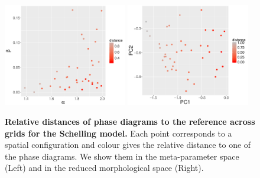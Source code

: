 \documentclass[preprint,5p,times,twocolumn,authoryear]{elsarticle}
\begin{document}
\begin{figure}[h!]
\centering
\includegraphics[width=0.48\textwidth]{figures/schelling-relativedistance_metaparams_red}
\includegraphics[width=0.48\textwidth]{figures/schelling-relativedistance_morphspace_red}
\caption{\textbf{Relative distances of phase diagrams to the reference across grids for the Schelling model.} Each point corresponds to a spatial configuration and colour gives the relative distance to one of the phase diagrams. We show them in the meta-parameter space (Left) and in the reduced morphological space (Right).\label{fig:schelling-distance-meta}}
\end{figure}


\section{}
\label{app:code}

\end{document}
